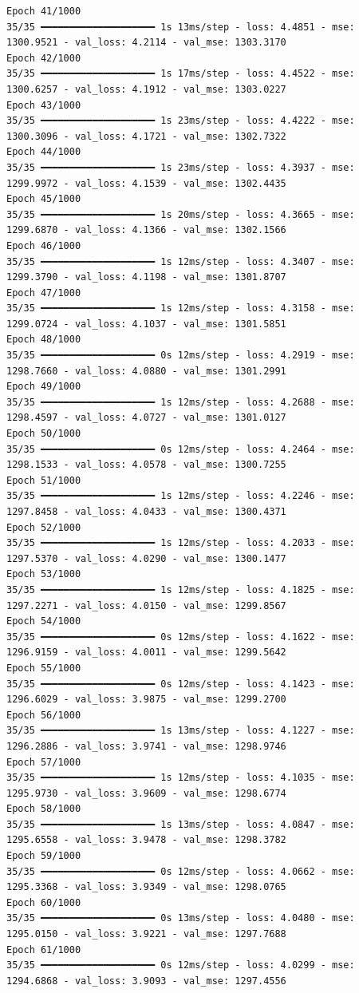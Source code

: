 \documentclass[
  letterpaper,
  DIV=11,
  numbers=noendperiod]{scrreprt}
\begin{document}
\begin{verbatim}
Epoch 41/1000
35/35 ━━━━━━━━━━━━━━━━━━━━ 1s 13ms/step - loss: 4.4851 - mse: 1300.9521 - val_loss: 4.2114 - val_mse: 1303.3170
Epoch 42/1000
35/35 ━━━━━━━━━━━━━━━━━━━━ 1s 17ms/step - loss: 4.4522 - mse: 1300.6257 - val_loss: 4.1912 - val_mse: 1303.0227
Epoch 43/1000
35/35 ━━━━━━━━━━━━━━━━━━━━ 1s 23ms/step - loss: 4.4222 - mse: 1300.3096 - val_loss: 4.1721 - val_mse: 1302.7322
Epoch 44/1000
35/35 ━━━━━━━━━━━━━━━━━━━━ 1s 23ms/step - loss: 4.3937 - mse: 1299.9972 - val_loss: 4.1539 - val_mse: 1302.4435
Epoch 45/1000
35/35 ━━━━━━━━━━━━━━━━━━━━ 1s 20ms/step - loss: 4.3665 - mse: 1299.6870 - val_loss: 4.1366 - val_mse: 1302.1566
Epoch 46/1000
35/35 ━━━━━━━━━━━━━━━━━━━━ 1s 12ms/step - loss: 4.3407 - mse: 1299.3790 - val_loss: 4.1198 - val_mse: 1301.8707
Epoch 47/1000
35/35 ━━━━━━━━━━━━━━━━━━━━ 1s 12ms/step - loss: 4.3158 - mse: 1299.0724 - val_loss: 4.1037 - val_mse: 1301.5851
Epoch 48/1000
35/35 ━━━━━━━━━━━━━━━━━━━━ 0s 12ms/step - loss: 4.2919 - mse: 1298.7660 - val_loss: 4.0880 - val_mse: 1301.2991
Epoch 49/1000
35/35 ━━━━━━━━━━━━━━━━━━━━ 1s 12ms/step - loss: 4.2688 - mse: 1298.4597 - val_loss: 4.0727 - val_mse: 1301.0127
Epoch 50/1000
35/35 ━━━━━━━━━━━━━━━━━━━━ 0s 12ms/step - loss: 4.2464 - mse: 1298.1533 - val_loss: 4.0578 - val_mse: 1300.7255
Epoch 51/1000
35/35 ━━━━━━━━━━━━━━━━━━━━ 1s 12ms/step - loss: 4.2246 - mse: 1297.8458 - val_loss: 4.0433 - val_mse: 1300.4371
Epoch 52/1000
35/35 ━━━━━━━━━━━━━━━━━━━━ 1s 12ms/step - loss: 4.2033 - mse: 1297.5370 - val_loss: 4.0290 - val_mse: 1300.1477
Epoch 53/1000
35/35 ━━━━━━━━━━━━━━━━━━━━ 1s 12ms/step - loss: 4.1825 - mse: 1297.2271 - val_loss: 4.0150 - val_mse: 1299.8567
Epoch 54/1000
35/35 ━━━━━━━━━━━━━━━━━━━━ 0s 12ms/step - loss: 4.1622 - mse: 1296.9159 - val_loss: 4.0011 - val_mse: 1299.5642
Epoch 55/1000
35/35 ━━━━━━━━━━━━━━━━━━━━ 0s 12ms/step - loss: 4.1423 - mse: 1296.6029 - val_loss: 3.9875 - val_mse: 1299.2700
Epoch 56/1000
35/35 ━━━━━━━━━━━━━━━━━━━━ 1s 13ms/step - loss: 4.1227 - mse: 1296.2886 - val_loss: 3.9741 - val_mse: 1298.9746
Epoch 57/1000
35/35 ━━━━━━━━━━━━━━━━━━━━ 1s 12ms/step - loss: 4.1035 - mse: 1295.9730 - val_loss: 3.9609 - val_mse: 1298.6774
Epoch 58/1000
35/35 ━━━━━━━━━━━━━━━━━━━━ 1s 13ms/step - loss: 4.0847 - mse: 1295.6558 - val_loss: 3.9478 - val_mse: 1298.3782
Epoch 59/1000
35/35 ━━━━━━━━━━━━━━━━━━━━ 0s 12ms/step - loss: 4.0662 - mse: 1295.3368 - val_loss: 3.9349 - val_mse: 1298.0765
Epoch 60/1000
35/35 ━━━━━━━━━━━━━━━━━━━━ 0s 13ms/step - loss: 4.0480 - mse: 1295.0150 - val_loss: 3.9221 - val_mse: 1297.7688
Epoch 61/1000
35/35 ━━━━━━━━━━━━━━━━━━━━ 0s 12ms/step - loss: 4.0299 - mse: 1294.6868 - val_loss: 3.9093 - val_mse: 1297.4556

\end{verbatim}
\end{document}
